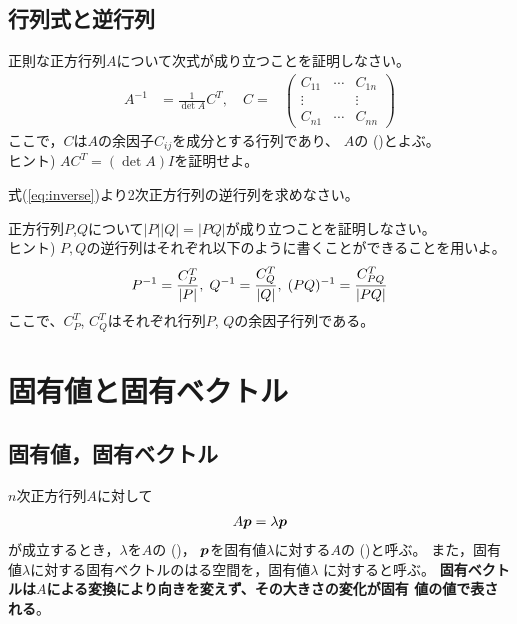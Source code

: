 \documentclass[twocolumn,11pt]{jarticle}
\begin{document}
\subsection{行列式と逆行列}
\nquestion\prog
正則な正方行列$A$について次式が成り立つことを証明しなさい。
\begin{align}
  A^{-1}&=\frac{1}{\det A}C^T,\quad
  C=&\left(
        \begin{array}{ccc}
          C_{11}&\cdots&C_{1n}\\
          \vdots&  &\vdots\\
          C_{n1}&\cdots&C_{nn}
        \end{array}\right)
\label{eq:inverse}
\end{align}
ここで，$C$は$A$の余因子$C_{ij}$を成分とする行列であり、
$A$の
()とよぶ。\\
ヒント) $AC^T=(\det A)I$を証明せよ。

\nquestion
式(\ref{eq:inverse})より2次正方行列の逆行列を求めなさい。

\nquestion
正方行列$P$,$Q$について$|P||Q|=|PQ|$が成り立つことを証明しなさい。
\\
ヒント)
  $P,Q$の逆行列はそれぞれ以下のように書くことができることを用いよ。
  \begin{align}
    P^{-1}=\frac{C_P^T}{|P|},\;
    Q^{-1}=\frac{C_Q^T}{|Q|},\;
    (PQ)^{-1}=\frac{C_{PQ}^T}{|PQ|}\notag
  \end{align}
  ここで、$C_P^T$, $C_Q^T$はそれぞれ行列$P$, $Q$の余因子行列である。


\section{固有値と固有ベクトル}

\subsection{固有値，固有ベクトル\label{sec:eigen}}

$n$次正方行列$A$に対して
  \begin{align}
    A\boldsymbol{p}=\lambda\boldsymbol{p}
  \end{align}
が成立するとき，$\lambda$を$A$の
()，
$\boldsymbol{p}$を固有値$\lambda$に対する$A$の
()と呼ぶ。
また，固有値$\lambda$に対する固有ベクトルのはる空間を，固有値$\lambda$
に対すると呼ぶ。
\textbf{固有ベクトルは$A$による変換により向きを変えず、その大きさの変化が固有
値の値で表される}。
\end{document}
